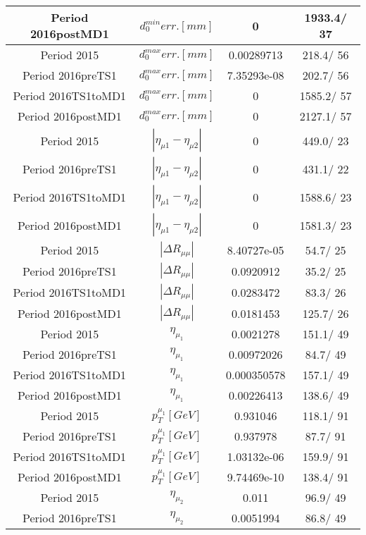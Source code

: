 \documentclass{article}
\begin{document}
\begin{longtable}{c|c|c|c}
\hline
 Period 2016postMD1 & $d_{0}^{min} err. [mm]$ & 0 & 1933.4/ 37\\
\hline
 Period 2015 & $d_{0}^{max} err. [mm]$ & 0.00289713 & 218.4/ 56\\
\hline
 Period 2016preTS1 & $d_{0}^{max} err. [mm]$ & 7.35293e-08 & 202.7/ 56\\
\hline
 Period 2016TS1toMD1 & $d_{0}^{max} err. [mm]$ & 0 & 1585.2/ 57\\
\hline
 Period 2016postMD1 & $d_{0}^{max} err. [mm]$ & 0 & 2127.1/ 57\\
\hline
 Period 2015 & $|\eta_{\mu1}-\eta_{\mu2}|$ & 0 & 449.0/ 23\\
\hline
 Period 2016preTS1 & $|\eta_{\mu1}-\eta_{\mu2}|$ & 0 & 431.1/ 22\\
\hline
 Period 2016TS1toMD1 & $|\eta_{\mu1}-\eta_{\mu2}|$ & 0 & 1588.6/ 23\\
\hline
 Period 2016postMD1 & $|\eta_{\mu1}-\eta_{\mu2}|$ & 0 & 1581.3/ 23\\
\hline
 Period 2015 & $|\Delta R_{\mu \mu}|$ & 8.40727e-05 &  54.7/ 25\\
\hline
 Period 2016preTS1 & $|\Delta R_{\mu \mu}|$ & 0.0920912 &  35.2/ 25\\
\hline
 Period 2016TS1toMD1 & $|\Delta R_{\mu \mu}|$ & 0.0283472 &  83.3/ 26\\
\hline
 Period 2016postMD1 & $|\Delta R_{\mu \mu}|$ & 0.0181453 & 125.7/ 26\\
\hline
 Period 2015 & $\eta_{\mu_{1}}$ & 0.0021278 & 151.1/ 49\\
\hline
 Period 2016preTS1 & $\eta_{\mu_{1}}$ & 0.00972026 &  84.7/ 49\\
\hline
 Period 2016TS1toMD1 & $\eta_{\mu_{1}}$ & 0.000350578 & 157.1/ 49\\
\hline
 Period 2016postMD1 & $\eta_{\mu_{1}}$ & 0.00226413 & 138.6/ 49\\
\hline
 Period 2015 & $p_{T}^{\mu_{1}} [GeV]$ & 0.931046 & 118.1/ 91\\
\hline
 Period 2016preTS1 & $p_{T}^{\mu_{1}} [GeV]$ & 0.937978 &  87.7/ 91\\
\hline
 Period 2016TS1toMD1 & $p_{T}^{\mu_{1}} [GeV]$ & 1.03132e-06 & 159.9/ 91\\
\hline
 Period 2016postMD1 & $p_{T}^{\mu_{1}} [GeV]$ & 9.74469e-10 & 138.4/ 91\\
\hline
 Period 2015 & $\eta_{\mu_{2}}$ & 0.011 &  96.9/ 49\\
\hline
 Period 2016preTS1 & $\eta_{\mu_{2}}$ & 0.0051994 &  86.8/ 49\\

\end{longtable}
\end{document}
